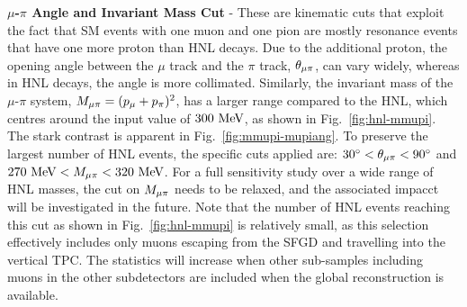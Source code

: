         \textbf{$\mu$-$\pi$ Angle and Invariant Mass Cut} - These are kinematic cuts that exploit the fact that SM events with one muon and one pion are mostly resonance events that have one more proton than HNL decays. Due to the additional proton, the opening angle between the $\mu$ track and the $\pi$ track, $\theta_{\mu\pi}$, can vary widely, whereas in HNL decays, the angle is more collimated. Similarly, the invariant mass of the $\mu$-$\pi$ system, $M_{\mu\pi}=(p_{\mu}+p_{\pi})^2$, has a larger range compared to the HNL, which centres around the input value of $300~\textrm{MeV}$, as shown in Fig.~\ref{fig:hnl-mmupi}.
        The stark contrast is apparent in Fig.~\ref{fig:mmupi-mupiang}. To preserve the largest number of HNL events, the specific cuts applied are: $30^\circ < \theta_{\mu\pi} < 90^\circ$ and $270~\textrm{MeV}<M_{\mu\pi}<320~\textrm{MeV}$. 
        For a full sensitivity study over a wide range of HNL masses, the cut on $M_{\mu\pi}$ needs to be relaxed, and the associated impacct will be investigated in the future.
        Note that the number of HNL events reaching this cut as shown in Fig.~\ref{fig:hnl-mmupi} is relatively small, as this selection effectively includes only muons escaping from the SFGD and travelling into the vertical TPC. 
        The statistics will increase when other sub-samples including muons in the other subdetectors are included when the global reconstruction is available.
